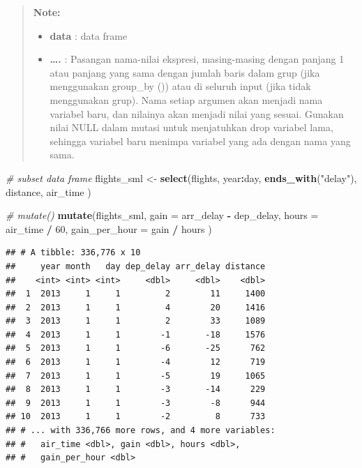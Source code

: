 \documentclass[]{book}
\newenvironment{Shaded}{\begin{snugshade}}{\end{snugshade}}
\newcommand{\KeywordTok}[1]{\textcolor[rgb]{0.13,0.29,0.53}{\textbf{#1}}}
\newcommand{\DataTypeTok}[1]{\textcolor[rgb]{0.13,0.29,0.53}{#1}}
\newcommand{\DecValTok}[1]{\textcolor[rgb]{0.00,0.00,0.81}{#1}}
\newcommand{\StringTok}[1]{\textcolor[rgb]{0.31,0.60,0.02}{#1}}
\newcommand{\CommentTok}[1]{\textcolor[rgb]{0.56,0.35,0.01}{\textit{#1}}}
\newcommand{\OperatorTok}[1]{\textcolor[rgb]{0.81,0.36,0.00}{\textbf{#1}}}
\newcommand{\NormalTok}[1]{#1}
\providecommand{\tightlist}{%
  \setlength{\itemsep}{0pt}\setlength{\parskip}{0pt}}
\begin{document}
\begin{quote}
\textbf{Note: }

\begin{itemize}
\tightlist
\item
  \textbf{data} : data frame
\item
  \textbf{\ldots{}.} : Pasangan nama-nilai ekspresi, masing-masing
  dengan panjang 1 atau panjang yang sama dengan jumlah baris dalam grup
  (jika menggunakan group\_by ()) atau di seluruh input (jika tidak
  menggunakan grup). Nama setiap argumen akan menjadi nama variabel
  baru, dan nilainya akan menjadi nilai yang sesuai. Gunakan nilai NULL
  dalam mutasi untuk menjatuhkan drop variabel lama, sehingga variabel
  baru menimpa variabel yang ada dengan nama yang sama.
\end{itemize}
\end{quote}

\begin{Shaded}
\begin{Highlighting}[]
\CommentTok{# subset data frame}
\NormalTok{flights_sml <-}\StringTok{ }\KeywordTok{select}\NormalTok{(flights,}
\NormalTok{  year}\OperatorTok{:}\NormalTok{day,}
  \KeywordTok{ends_with}\NormalTok{(}\StringTok{"delay"}\NormalTok{),}
\NormalTok{  distance,}
\NormalTok{  air_time}
\NormalTok{)}

\CommentTok{# mutate()}
\KeywordTok{mutate}\NormalTok{(flights_sml,}
  \DataTypeTok{gain =}\NormalTok{ arr_delay }\OperatorTok{-}\StringTok{ }\NormalTok{dep_delay,}
  \DataTypeTok{hours =}\NormalTok{ air_time }\OperatorTok{/}\StringTok{ }\DecValTok{60}\NormalTok{,}
  \DataTypeTok{gain_per_hour =}\NormalTok{ gain }\OperatorTok{/}\StringTok{ }\NormalTok{hours}
\NormalTok{)}
\end{Highlighting}
\end{Shaded}

\begin{verbatim}
## # A tibble: 336,776 x 10
##     year month   day dep_delay arr_delay distance
##    <int> <int> <int>     <dbl>     <dbl>    <dbl>
##  1  2013     1     1         2        11     1400
##  2  2013     1     1         4        20     1416
##  3  2013     1     1         2        33     1089
##  4  2013     1     1        -1       -18     1576
##  5  2013     1     1        -6       -25      762
##  6  2013     1     1        -4        12      719
##  7  2013     1     1        -5        19     1065
##  8  2013     1     1        -3       -14      229
##  9  2013     1     1        -3        -8      944
## 10  2013     1     1        -2         8      733
## # ... with 336,766 more rows, and 4 more variables:
## #   air_time <dbl>, gain <dbl>, hours <dbl>,
## #   gain_per_hour <dbl>
\end{verbatim}
\end{document}

